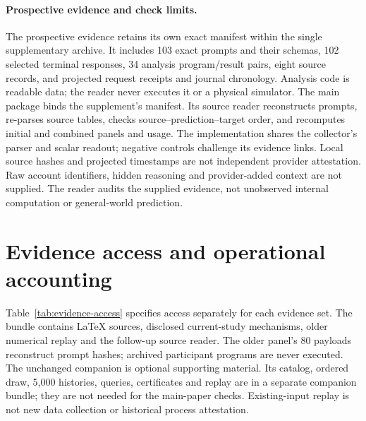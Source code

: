 \paragraph{Prospective evidence and check limits.}
The prospective evidence retains its own exact manifest within the single
supplementary archive. It includes
103 exact prompts and their schemas, 102 selected terminal responses,
34 analysis program/result pairs, eight source records, and projected request
receipts and journal chronology. Analysis code is readable data; the reader
never executes it or a physical simulator. The main package binds the
supplement's manifest. Its source reader reconstructs prompts, re-parses
source tables, checks source--prediction--target order, and recomputes initial
and combined panels and usage. The implementation shares the collector's
parser and scalar readout; negative controls challenge its evidence links.
Local source hashes and projected timestamps are not independent provider
attestation. Raw account identifiers, hidden reasoning and provider-added
context are not supplied. The reader audits the supplied evidence, not
unobserved internal computation or general-world prediction.


\section{Evidence access and operational accounting}
\label{app:reader-access}
Table~\ref{tab:evidence-access} specifies access separately for each evidence
set. The bundle contains LaTeX sources, disclosed current-study mechanisms,
older numerical replay and the follow-up source reader. The older panel's
80 payloads reconstruct prompt hashes; archived participant programs are
never executed. The unchanged companion is optional supporting material. Its catalog,
ordered draw, 5,000 histories, queries, certificates and replay are in a
separate companion bundle; they are not needed for the main-paper checks. Existing-input replay is not new data collection or
historical process attestation.

